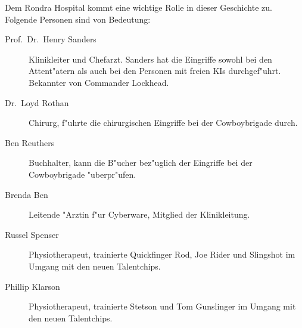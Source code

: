 
Dem Rondra Hospital kommt eine wichtige Rolle in dieser Geschichte zu. Folgende Personen sind von Bedeutung:

\begin{description}
    \item[Prof.~Dr.~Henry Sanders] Klinikleiter und Chefarzt. Sanders hat die Eingriffe sowohl bei den Attent"atern als auch bei den 
        Personen mit freien KIs durchgef"uhrt. Bekannter von Commander Lockhead.
    \item[Dr.~Loyd Rothan] Chirurg, f"uhrte die chirurgischen Eingriffe bei der Cowboybrigade durch.
    \item[Ben Reuthers] Buchhalter, kann die B"ucher bez"uglich der Eingriffe bei der Cowboybrigade "uberpr"ufen.
    \item[Brenda Ben] Leitende "Arztin f"ur Cyberware, Mitglied der Klinikleitung.
    \item[Russel Spenser] Physiotherapeut, trainierte Quickfinger Rod, Joe Rider und Slingshot im Umgang mit den neuen Talentchips.
    \item[Phillip Klarson] Physiotherapeut, trainierte Stetson und Tom Gunslinger im Umgang mit den neuen Talentchips.
\end{description}

